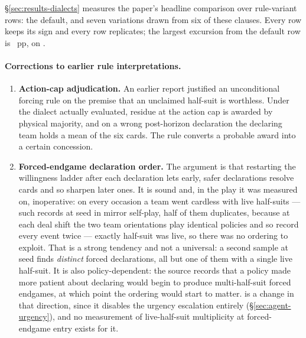 \S\ref{sec:results-dialects} measures the paper's headline comparison over \vsevenDiaRows{}
rule-variant rows: the default, and seven variations drawn from six of these clauses. Every row keeps its sign and every row replicates; the largest excursion from the
default row is \vsevenDiaMaxExcursion{}~pp, on \vsevenDiaMaxExcursionRow{}.

\paragraph{Corrections to earlier rule interpretations.}

\begin{enumerate}
\item \textbf{Action-cap adjudication.} An earlier report justified an
  unconditional forcing rule on the premise that an unclaimed half-suit is worthless. Under the
  dialect actually evaluated, residue at the action cap is awarded by physical majority, and on a
  wrong post-horizon declaration the declaring team holds a mean \numResidueHeld{} of the six cards.
  The rule converts a probable award into a certain concession.
\item \textbf{Forced-endgame declaration order.} The argument is that restarting
  the willingness ladder after each declaration lets early, safer declarations resolve cards and so
  sharpen later ones. It is sound and, in the play it was measured on, inoperative: on every occasion
  a team went cardless with live half-suits --- \numLadderOccasions{} such records at seed
  \numLadderSeed{} in \vfour{} mirror self-play, half of them duplicates, because at each deal shift
  the two team orientations play identical policies and so record every event twice ---
  exactly \numLadderLiveSets{} half-suit was live,
  so there was no ordering to exploit. That is a strong tendency and not a universal: a second
  sample at seed \vsevenLadderSecondSeed{} finds \vsevenLadderSecondTotal{} \emph{distinct} forced
  declarations, all but one of them with a single live half-suit. It is also
  policy-dependent: the source
  records that a policy made more patient about declaring would begin to produce multi-half-suit
  forced endgames, at which point the ordering would start to matter. \sestina{} is a change in
  that direction, since it disables the urgency escalation entirely
  (\S\ref{sec:agent-urgency}), and no measurement of live-half-suit multiplicity at forced-endgame
  entry exists for it.
\end{enumerate}
